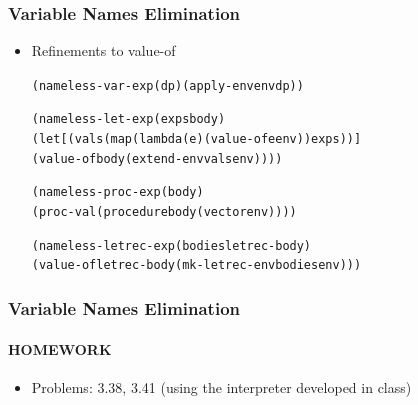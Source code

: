 \documentclass{beamer}
\begin{document}
\begin{frame}[fragile]
\frametitle{Variable Names Elimination}
\begin{scriptsize}
\begin{itemize}
\item<1-> Refinements to value-of
\begin{alltt}
(nameless-var-exp (d p) (apply-env env d p))

(nameless-let-exp (exps body)
  (let [(vals (map (lambda (e) (value-of e env)) exps))]
    (value-of body (extend-env vals env))))

(nameless-proc-exp (body)
  (proc-val (procedure body (vector env))))

(nameless-letrec-exp (bodies letrec-body)
  (value-of letrec-body (mk-letrec-env bodies env)))
\end{alltt}

\end{itemize}
\end{scriptsize}
\end{frame}

\begin{frame}[fragile]
\frametitle{Variable Names Elimination}
\framesubtitle{HOMEWORK}
\begin{scriptsize}
\begin{itemize}
\item<1-> Problems: 3.38, 3.41 (using the interpreter developed in class)

\end{itemize}
\end{scriptsize}
\end{frame}
\end{document}
